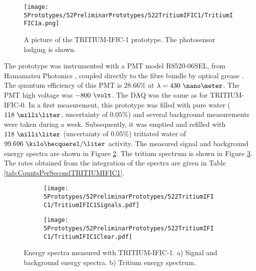 \begin{figure}[h]
\centering
\texttt{[image: 5Prototypes/52PreliminarPrototypes/522TritiumIFIC1/TritiumIFIC1a.png]}
\caption{A picture of the TRITIUM-IFIC-1 prototype. The photosensor lodging is shown.\label{fig:TritumIFIC1}}
\end{figure}
The prototype was instrumented with a PMT model R8520-06SEL, from Hamamatsu Photonics \cite{DataSheetPMTs}, coupled directly to the fibre bundle by optical grease \cite{OpticalGrease}. The quantum efficiency of this PMT is $28.66\%$ at $\lambda=430~\nano\meter$.  The PMT high voltage was $-800~\volt$. The DAQ was the same as for TRITIUM-IFIC-0. In a first measurement, this prototype was filled with pure water ($118~\milli\liter$, uncertainty of $0.05\%$) and several background measurements were taken during a week. Subsequently, it was emptied and refilled with $118~\milli\liter$ (uncertainty of $0.05\%$) tritiated water of $99.696~\kilo\becquerel/\liter$ activity. The measured signal and background energy spectra are shown in Figure \ref{subfig:SignalBackgroundEnergySpectraTritiumIFIC1}. The tritium spectrum is shown in Figure \ref{subfig:TritiumEnergySpectraTritiumIFIC1}. The rates obtained from the integration of the spectra are given in Table \ref{tab:CountsPerSecondTRITIUMIFIC1}. 

\begin{figure}
\centering
    \begin{subfigure}[b]{1\textwidth}
    \centering
    \texttt{[image: 5Prototypes/52PreliminarPrototypes/522TritiumIFIC1/TritiumIFIC1Signals.pdf]}  
    \caption{\label{subfig:SignalBackgroundEnergySpectraTritiumIFIC1}}
    \end{subfigure}
    \hfill
    \begin{subfigure}[b]{1\textwidth}
    \centering
    \texttt{[image: 5Prototypes/52PreliminarPrototypes/522TritiumIFIC1/TritiumIFIC1Clear.pdf]}  
    \caption{\label{subfig:TritiumEnergySpectraTritiumIFIC1}}
    \end{subfigure}
 \caption{Energy spectra measured with TRITIUM-IFIC-1. a) Signal and background energy spectra. b) Tritium energy spectrum.}
 \label{fig:EnergySpectraTRITIUMIFIC1}
\end{figure}

